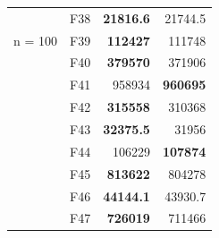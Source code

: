 \begin{table}[]
\begin{tabular}{ll|r|r|}
\multicolumn{1}{|l|}{\cellcolor[HTML]{ECF4FF}}                           & \cellcolor[HTML]{FCE6AB}F38     & \cellcolor[HTML]{D3FFB6}\textbf{21816.6}                       & 21744.5                                                   \\ \cline{2-4} 
\multicolumn{1}{|l|}{\multirow{-39}{*}{\cellcolor[HTML]{ECF4FF}n = 100}} & \cellcolor[HTML]{FCE6AB}F39     & \cellcolor[HTML]{D3FFB6}\textbf{112427}                        & 111748                                                    \\ \hline
\multicolumn{1}{|l|}{\cellcolor[HTML]{ECF4FF}}                           & \cellcolor[HTML]{FCE6AB}F40     & \cellcolor[HTML]{D3FFB6}\textbf{379570}                        & 371906                                                    \\ \cline{2-4} 
\multicolumn{1}{|l|}{\cellcolor[HTML]{ECF4FF}}                           & \cellcolor[HTML]{FCE6AB}F41     & 958934                                                         & \cellcolor[HTML]{D3FFB6}\textbf{960695}                   \\ \cline{2-4} 
\multicolumn{1}{|l|}{\cellcolor[HTML]{ECF4FF}}                           & \cellcolor[HTML]{FCE6AB}F42     & \cellcolor[HTML]{D3FFB6}\textbf{315558}                        & 310368                                                    \\ \cline{2-4} 
\multicolumn{1}{|l|}{\cellcolor[HTML]{ECF4FF}}                           & \cellcolor[HTML]{FCE6AB}F43     & \cellcolor[HTML]{D3FFB6}\textbf{32375.5}                       & 31956                                                     \\ \cline{2-4} 
\multicolumn{1}{|l|}{\cellcolor[HTML]{ECF4FF}}                           & \cellcolor[HTML]{FCE6AB}F44     & 106229                                                         & \cellcolor[HTML]{D3FFB6}\textbf{107874}                   \\ \cline{2-4} 
\multicolumn{1}{|l|}{\cellcolor[HTML]{ECF4FF}}                           & \cellcolor[HTML]{FCE6AB}F45     & \cellcolor[HTML]{D3FFB6}\textbf{813622}                        & 804278                                                    \\ \cline{2-4} 
\multicolumn{1}{|l|}{\cellcolor[HTML]{ECF4FF}}                           & \cellcolor[HTML]{FCE6AB}F46     & \cellcolor[HTML]{D3FFB6}\textbf{44144.1}                       & 43930.7                                                   \\ \cline{2-4} 
\multicolumn{1}{|l|}{\cellcolor[HTML]{ECF4FF}}                           & \cellcolor[HTML]{FCE6AB}F47     & \cellcolor[HTML]{D3FFB6}\textbf{726019}                        & 711466                                                    \\ \cline{2-4} 

\end{tabular}
\end{table}
